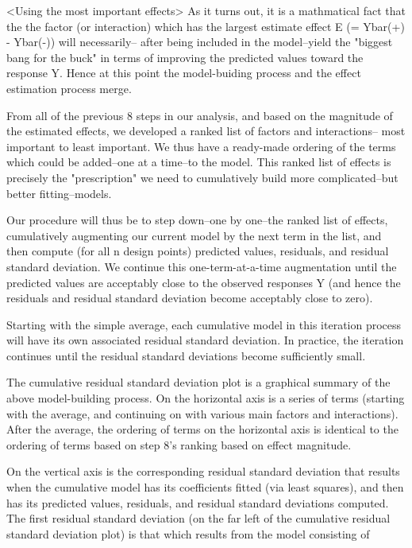 <Using the most important effects>
As it turns out, it is a mathmatical fact that the
the factor (or interaction) which has the largest
estimate effect E (= Ybar(+) - Ybar(-)) will
necessarily-- after being included in the
model--yield the "biggest bang for the buck" in
terms of improving the predicted values toward the
response Y. Hence at this point the model-buiding
process and the effect estimation process merge.

From all of the previous 8 steps in our analysis,
and based on the magnitude of the estimated
effects, we developed a ranked list of factors and
interactions-- most important to least important.
We thus have a ready-made ordering of the terms
which could be added--one at a time--to the model.
This ranked list of effects is precisely the
"prescription" we need to cumulatively build more
complicated--but better fitting--models.

Our procedure will thus be to step down--one by
one--the ranked list of effects, cumulatively
augmenting our current model by the next term in
the list, and then compute (for all n design
points) predicted values, residuals, and residual
standard deviation.  We continue this
one-term-at-a-time augmentation until the
predicted values are acceptably close to the
observed responses Y (and hence the residuals and
residual standard deviation become acceptably
close to zero).

Starting with the simple average, each cumulative
model in this iteration process will have its own
associated residual standard deviation.  In
practice, the iteration continues until the
residual standard deviations become sufficiently
small.

The cumulative residual standard deviation plot is
a graphical summary of the above model-building
process.  On the horizontal axis is a series of
terms (starting with the average, and continuing
on with various main factors and interactions).
After the average, the ordering of terms on the
horizontal axis is identical to the ordering of
terms based on step 8's ranking based on effect
magnitude.

On the vertical axis is the corresponding residual
standard deviation that results when the
cumulative model has its coefficients fitted (via
least squares), and then has its predicted values,
residuals, and residual standard deviations
computed.  The first residual standard deviation
(on the far left of the cumulative residual
standard deviation plot) is that which results
from the model consisting of

